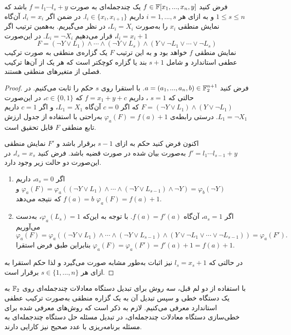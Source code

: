 \begin{lemma}
	\label{lemma3}
فرض کنید 
$f\in \mathbb{F}[x_{1},...,x_{n},y]$
یک چندجمله‌ای به صورت 
$f = l_{1}\cdots l_{s} + y$
باشد که 
$1\leq s\leq n$
و به ازای هر 
$i = 1,...,s$
داریم
$l_{i}\in\{x_{i},x_{i+1}\}$.
در ضمن اگر 
$l_{i} = x_{i}$، 
آن‌گاه  نمایش منطقی 
$x_{i}$
را به‌صورت 
$L_{i} = X_{i}$، 
در نظر می‌گیریم. به‌همین ترتیب  اگر 
$l_{i} = x_{i}+1$، 
قرار می‌دهیم 
$L_{i} = \neg X_{i}$. 
در این‌صورت 
$$F = (\neg Y \vee L_{1})\wedge \cdots \wedge (\neg Y\vee L_{s})\wedge (Y\vee \neg L_{1}\vee \cdots \vee \neg L_{s})$$
نمایش منطقی 
$f$
خواهد بود و به این ‌ترتیب 
$F$ 
یک گزاره‌ی منطقی به صورت ترکیب عطفی استاندارد و شامل 
$s+1$
بند یا گزاره کوچکتر است که هر یک از آن‌ها ترکیب فصلی از متغیرهای منطقی هستند. 
\end{lemma}
\begin{proof}
فرض کنید 
$a = (a_{1},...,a_{n},b)\in\mathbb{F}_{2}^{n+1}$. 
با استقرا روی 
$s$
حکم را ثابت می‌کنیم. در حالتی که 
$s = 1$
، داریم 
$f = x_{1} + y + c$
که 
$c\in\{0,1\}$، 
در این‌صورت 
$F = (\neg Y \vee L_{1})\wedge (Y \vee \neg L_{1})$
که اگر 
$c = 0$
آن‌گاه 
$L_{1} = X_{1}$، 
و اگر 
$c = 1$
داریم 
$L_{1} = \neg X_{1}$.
درستی رابطه‌ی 
$\varphi_{a}(F) = f(a) + 1$
به‌راحتی با استفاده از جدول ارزش تابع منطقی 
$F$
قابل تحقیق است. 

اکنون فرض کنید حکم به ازای 
$s-1$
برقرار باشد و 
$F'$
نمایش منطقی 
$f' = l_{1}\cdots l_{s-1} + y$
به‌صورت بیان شده در صورت قضیه باشد. فرض کنید 
$l_{s} = x_{s}$، 
در این‌صورت دو حالت زیر وجود دارد.
\begin{enumerate}
\item
اگر 
$a_{s} = 0$، 
داریم 
$\varphi_{a}(F) = \varphi_{a}((\neg Y\vee L_{1})\wedge \cdots \wedge (\neg Y\vee L_{s-1})\wedge \neg Y) = \varphi_{b}(\neg Y)$
و 
$f(a) = b$ 
که نتیجه می‌دهد 
$\varphi_{a}(F) = f(a) + 1$.
\item 
اگر 
$a_{s} = 1$،
 آن‌گاه 
 $f(a) = f'(a)$. 
 با توجه به این‌که 
$\varphi_{a}(L_{s}) = 1$، 
به‌دست می‌آوریم
$$\varphi_{a}(F) = \varphi_{a}((\neg Y \vee L_{1})\wedge \cdots \wedge (\neg Y\vee L_{s-1})\wedge (Y\vee \neg L_{1}\vee\cdots\vee \neg L_{s-1})) = \varphi_{a}(F').$$
بنابراین طبق فرض استقرا 
$\varphi_{a}(F) = \varphi_{a}(F') = f'(a) + 1 = f(a) + 1$.
\end{enumerate}
در حالتی که 
$l_{s} = x_{s} + 1$
نیز اثبات به‌طور مشابه صورت می‌گیرد و لذا حکم استقرا به ازای هر 
$s\in\{1,...,n\}$
برقرار است. 
\end{proof}
با استفاده از دو لم قبل، سه روش برای تبدیل دستگاه معادلات چندجمله‌ای روی 
$\mathbb{F}_{2}$
به یک دستگاه خطی و سپس تبدیل آن به یک گزاره منطقی به‌صورت ترکیب عطفی استاندارد معرفی می‌کنیم. لازم به ذکر است که روش‌های معرفی شده برای خطی‌سازی  دستگاه معادلات چند‌جمله‌ای، در  تبدیل  مسئله حل دستگاه چندجمله‌ای به مسئله برنامه‌ریزی با عدد صحیح نیز کارایی دارند. 
